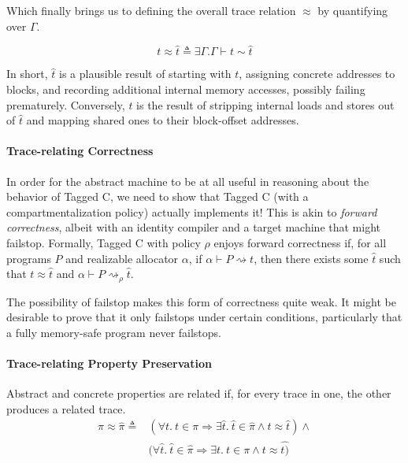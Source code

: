 \documentclass{article}
\begin{document}
Which finally brings us to defining the overall trace relation \(\approx\)
by quantifying over \(\Gamma\).

\[t \approx \hat{t} \triangleq \exists \Gamma . \Gamma \vdash t \sim \hat{t}\]

In short, \(\hat{t}\) is a plausible result of starting with \(t\), assigning concrete
addresses to blocks, and recording additional internal memory accesses, possibly failing prematurely.
Conversely, \(t\) is the result of stripping internal loads and stores out of \(\hat{t}\) and
mapping shared ones to their block-offset addresses.

\paragraph{Trace-relating Correctness}

In order for the abstract machine to be at all useful in reasoning about the behavior of Tagged
C, we need to show that Tagged C (with a compartmentalization policy) actually implements it!
This is akin to {\em forward correctness}, albeit with an identity compiler and a target machine
that might failstop. 
Formally, Tagged C with policy \(\rho\) enjoys forward correctness if,
for all programs \(P\) and realizable allocator \(\alpha\), if \(\alpha \vdash P \rightsquigarrow t\),
then there exists some \(\hat{t}\) such that \(t \approx \hat{t}\) and
\(\alpha \vdash P \rightsquigarrow_\rho \hat{t}\).

The possibility of failstop makes this form of correctness quite weak. It might be desirable to
prove that it only failstops under certain conditions, particularly that a fully memory-safe
program never failstops. 

\paragraph{Trace-relating Property Preservation}

Abstract and concrete properties are related if, for every trace in one, the other produces a
related trace.
\[\begin{split}
\pi \approx \hat{\pi} \triangleq
& (\forall t . ~ t \in \pi \Rightarrow \exists \hat{t} . ~ \hat{t} \in \hat{\pi} \land t \approx \hat{t}) \land \\
& (\forall \hat{t} . ~ \hat{t} \in \hat{\pi} \Rightarrow \exists t . ~ t \in \pi \land t \approx \hat{t)} \\
\end{split}\]
\end{document}
